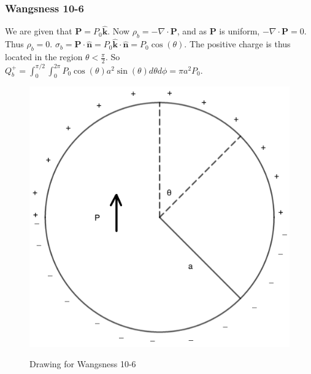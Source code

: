 \documentclass[oneside]{book}
\theoremstyle{mystyle}
\begin{document}
\subsubsection{Wangsness 10-6}
We are given that $\mathbf{P} = P_0 \hat{\mathbf{k}}$. Now $\rho_{b} = -\nabla \cdot \mathbf{P}$, and as $\mathbf{P}$ is uniform, $-\nabla \cdot \mathbf{P} = 0$. Thus $\rho_b = 0$. $\sigma_b = \mathbf{P}\cdot \hat{\mathbf{n}} = P_0 \hat{\mathbf{k}} \cdot \hat{\mathbf{n}} = P_0 \cos(\theta)$. The positive charge is thus located in the region $\theta < \frac{\pi}{2}$. So $Q_b^+ = \int_{0}^{\pi/2}\int_{0}^{2\pi} P_0 \cos(\theta) a^2 \sin(\theta) d\theta d\phi = \pi a^2 P_0$.
\begin{figure}[htbp]
    \centering
    {\includegraphics[scale=0.3]{10-6.png}}
    \caption{Drawing for Wangsness 10-6}
\end{figure}
\end{document}
